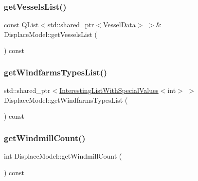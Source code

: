 \subsubsection{\texorpdfstring{getVesselsList()}{getVesselsList()}}
{\footnotesize\ttfamily const Q\+List$<$std\+::shared\+\_\+ptr$<$\mbox{\hyperlink{class_vessel_data}{Vessel\+Data}}$>$ $>$\& Displace\+Model\+::get\+Vessels\+List (\begin{DoxyParamCaption}{ }\end{DoxyParamCaption}) const\hspace{0.3cm}{\ttfamily [inline]}}

\mbox{\label{class_displace_model_afe5c60783bd92ec7c3eb3554c1facccf}} 
\subsubsection{\texorpdfstring{getWindfarmsTypesList()}{getWindfarmsTypesList()}}
{\footnotesize\ttfamily std\+::shared\+\_\+ptr$<$\mbox{\hyperlink{class_interesting_list_with_special_values}{Interesting\+List\+With\+Special\+Values}}$<$int$>$ $>$ Displace\+Model\+::get\+Windfarms\+Types\+List (\begin{DoxyParamCaption}{ }\end{DoxyParamCaption}) const\hspace{0.3cm}{\ttfamily [inline]}}

\mbox{\label{class_displace_model_a4abcdf4aa9268b3e9e88a1c098d7b165}} 
\subsubsection{\texorpdfstring{getWindmillCount()}{getWindmillCount()}}
{\footnotesize\ttfamily int Displace\+Model\+::get\+Windmill\+Count (\begin{DoxyParamCaption}{ }\end{DoxyParamCaption}) const}

\mbox{\label{class_displace_model_a5558f67ffe30cdef4b879a240f8b786f}} 
